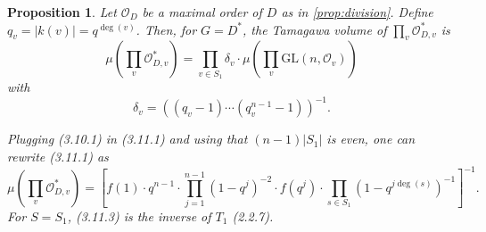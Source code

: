 \documentclass[11pt,a4paper]{article}
\theoremstyle{plain}
\newtheorem{proposition}[theorem]{Proposition}
\theoremstyle{definition}
\newcommand{\GL}{\mathrm{GL}}
\begin{document}
\begin{proposition}\label{prop:dtam}
Let $\mathcal{O}_D$ be a maximal order of $D$ as in \ref{prop:division}. Define $q_v = |k(v)| = q^{\deg(v)}$. Then, for $G = D^*$, the Tamagawa volume of $\prod_v \mathcal{O}_{D,v}^*$ is
\begin{equation}
\mu\left(\prod_v \mathcal{O}_{D,v}^*\right) = \prod_{v \in S_1} \delta_v \cdot \mu\left(\prod_v \GL(n, \mathcal{O}_v)\right) \tag{3.11.1}
\end{equation}
with
\begin{equation}
\delta_v = ((q_v - 1) \cdots (q_v^{n-1} - 1))^{-1}. \tag{3.11.2}
\end{equation}

Plugging (3.10.1) in (3.11.1) and using that $(n-1)|S_1|$ is even, one can rewrite (3.11.1) as
\begin{equation}\label{eq:dtam}
\mu\left(\prod_v \mathcal{O}_{D,v}^*\right) = \left[ f(1) \cdot q^{n-1} \cdot \prod_{j=1}^{n-1} (1-q^j)^{-2} \cdot f(q^j) \cdot \prod_{s \in S_1} (1-q^{j\deg(s)})^{-1} \right]^{-1}. \tag{3.11.3}
\end{equation}
For $S = S_1$, (3.11.3) is the inverse of $T_1$ (2.2.7).
\end{proposition}
\end{document}

